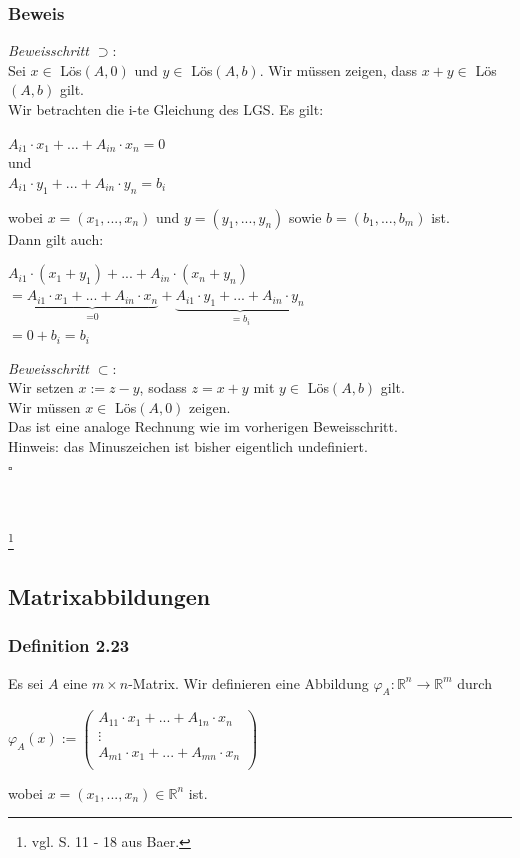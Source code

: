 \documentclass{article}
\begin{document}
\subsubsection*{Beweis}
\textit{Beweisschritt $\supset$}: \\
Sei $x \in$ Lös$(A,0)$ und $y \in$ Lös$(A,b)$.
Wir müssen zeigen, dass $x+y \in$ Lös$(A,b)$ gilt. \\
Wir betrachten die i-te Gleichung des LGS. Es gilt: \\
\begin{center}
    $A_{i1} \cdot x_1 + ... + A_{in} \cdot x_n = 0$ \\
    und \\
    $A_{i1} \cdot y_1 + ... + A_{in} \cdot y_n = b_i$
\end{center}
wobei $x=(x_1, ..., x_n)$ und $y=(y_1, ..., y_n)$ sowie $b=(b_1, ..., b_m)$ ist. \\
Dann gilt auch: \\
\begin{center}
    $A_{i1} \cdot (x_1 + y_1) + ... + A_{in} \cdot (x_n + y_n)$ \\
    $= \underbrace{A_{i1} \cdot x_1 + ... + A_{in} \cdot x_n}_{\text{=0}} + \underbrace{A_{i1} \cdot y_1 + ... + A_{in} \cdot y_n}_{\text{$=b_i$}}$ \\   
    $= 0 + b_i = b_i$
\end{center}
\textit{Beweisschritt $\subset$}: \\
Wir setzen $x:=z-y$, sodass $z=x+y$ mit $y \in $ Lös$(A,b)$ gilt. \\
Wir müssen $x \in$ Lös$(A,0)$ zeigen. \\
Das ist eine analoge Rechnung wie im vorherigen Beweisschritt. \\
Hinweis: das Minuszeichen ist bisher eigentlich undefiniert. \\
$\square$ \\
\\
\\
\date{Mittwoch, 15.11.23} \footnote{vgl. S. 11 - 18 aus Baer.}
\\
\subsection{Matrixabbildungen}
\subsubsection*{Definition 2.23}

Es sei $A$ eine $m \times n$-Matrix. Wir definieren eine Abbildung $\varphi_A: \mathbb{R}^n \rightarrow \mathbb{R}^m$ durch
\begin{center}
    $\varphi_A(x):=\begin{pmatrix}
        A_{11} \cdot x_1 + ... + A_{1n} \cdot x_n \\
        \vdots \\
        A_{m1} \cdot x_1 + ... + A_{mn} \cdot x_n \\
    \end{pmatrix}$ \\
\end{center}
wobei $x=(x_1, ..., x_n) \in \mathbb{R}^n$ ist.
\\
\end{document}
